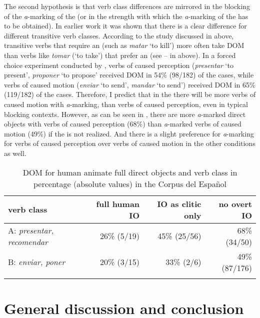 \documentclass[output=paper]{LSP/langsci}
\begin{document}
The second hypothesis is that verb class differences are mirrored in the blocking of the \textit{a}-marking of the  (or in the strength with which the \textit{a}-marking of the  has to be obtained). In earlier work it was shown that there is a clear difference for different transitive verb classes. According to the study discussed in  above, transitive verbs that require an   (such as \textit{matar} ‘to kill’) more often take DOM than verbs like \textit{tomar} (‘to take’) that prefer an   (see -- in  above). In a forced choice experiment conducted by \citet{vonHeusinger2017Case}, verbs of caused perception (\textit{presentar} ‘to present’, \textit{proponer} ‘to propose’ received DOM in 54\% (98/182) of the cases, while verbs of caused motion (\textit{enviar} ‘to send’, \textit{mandar} ‘to send’) received DOM in 65\% (119/182) of the cases. Therefore, I predict that in the  there will be more verbs of caused motion with \textit{a}-marking, than verbs of caused perception, even in typical blocking contexts. However, as can be seen in , there are more \textit{a}-marked direct objects with verbs of caused perception (68\%) than \textit{a}-marked verbs of caused motion (49\%) if the  is not realized. And there is a slight preference for \textit{a}-marking for verbs of caused perception over verbs of caused motion in the other conditions as well.

\begin{table}
\caption{DOM for human animate full direct objects and verb class in percentage (absolute values) in the Corpus del Español}
\label{11-he-tab:15}


\begin{tabularx}{\textwidth}{Q rrr}
\lsptoprule
verb class & full human IO & IO as clitic only & no overt IO\\
\midrule
A: \textit{presentar, recomendar} & 26\% (5/19) & 45\% (25/56) & 68\% (34/50)\\
B: \textit{enviar, poner} & 20\% (3/15) & 33\% (2/6) & 49\% (87/176)\\
\lspbottomrule
\end{tabularx}
\end{table}


\section{General discussion and conclusion} %
\label{11-he-sec:5}
\end{document}
